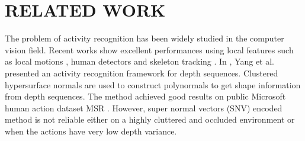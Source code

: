 \documentclass[a4paper, 10pt, conference]{ieeeconf}      %
\begin{document}
\section{RELATED WORK}
\label{section:relatedWork}

	The problem of activity recognition has been widely studied in the computer vision field. Recent works show excellent performances using local features such as local motions \cite{c10, c11}, human detectors \cite{c12} and skeleton tracking \cite{c13}. In \cite{c11}, Yang et al. presented an activity recognition framework for depth sequences. Clustered hypersurface normals are used to construct polynormals to get shape information from depth sequences. The method achieved good results on public Microsoft human action dataset MSR \cite{c17}. However, super normal vectors (SNV) encoded method is not reliable either on a highly cluttered and occluded environment or when the actions have very low depth variance.

    
\end{document}
